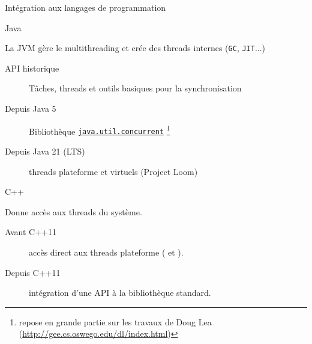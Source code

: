 
\begingroup

\begin{frame}{Intégration aux langages de programmation}
  
  \begin{block}{Java}
    
    La JVM gère le multithreading et crée des threads internes (\texttt{GC}, \texttt{JIT}...)

    \begin{description}
    \item[API historique] Tâches, threads et outils basiques pour la synchronisation
    \item[Depuis Java 5] Bibliothèque \href{https://docs.oracle.com/javase/8/docs/api/java/util/concurrent/package-summary.html}{\lstinline{java.util.concurrent}}
      \footnote{repose en grande partie sur les travaux de Doug Lea (\url{http://gee.cs.oswego.edu/dl/index.html})}
    \item[Depuis Java 21 (LTS)] threads plateforme et virtuels (Project Loom)
    \end{description}

  \end{block}

  \begin{block}{C++}

    Donne accès aux threads du système.

    \begin{description}
    \item[Avant C++11] accès direct aux threads plateforme ( et ).
    \item[Depuis C++11] intégration d'une API à la bibliothèque standard.
    \end{description}

  \end{block}

\end{frame}

\endgroup
\endinput
